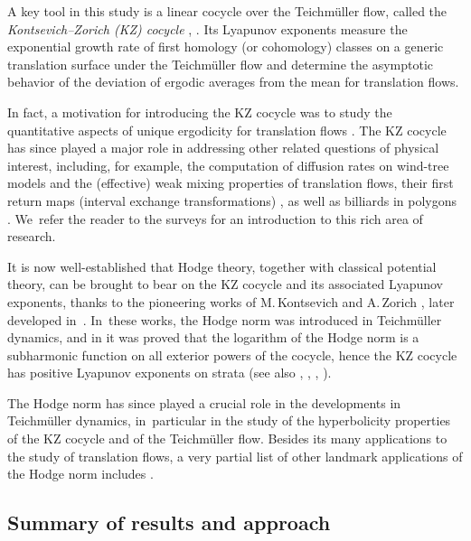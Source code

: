 \documentclass[10pt]{amsart}
\theoremstyle{plain}
\theoremstyle{definition}
\numberwithin{equation}{subsection}
\begin{document}
A key tool in this study is a linear cocycle over the Teichmüller flow, called the \emph{Kontsevich–Zorich (KZ) cocycle} \cite{KZ97}, \cite{Kon97}. Its Lyapunov exponents measure the exponential growth rate of first homology (or cohomology) classes on a generic translation surface under the Teichmüller flow and determine the asymptotic behavior of the deviation of ergodic averages from the mean for translation flows.

In fact, a motivation for introducing the KZ cocycle was to study the quantitative aspects of unique ergodicity for translation flows \cite{Z96,Z97,KZ97, Kon97, For02, AtF08}. The KZ cocycle has since played a major role in addressing other related questions of physical interest, including, for example, the computation of diffusion rates on wind-tree models \cite{DHL14} and the (effective) weak mixing properties of translation flows, their first return maps (interval exchange transformations) \cite{AF04, BS21, For22, AFS23}, as well as billiards in polygons \cite{CF20, AHCF24}. We~refer the reader to the surveys \cite{Z06, FM13, W15, For24} for an introduction to this rich area of research.

It is now well-established that Hodge theory, together with classical potential theory, can be brought to bear on the KZ cocycle and its associated Lyapunov exponents, thanks to the pioneering works of M.\,Kontsevich and A.\,Zorich \cite{KZ97, Kon97}, later developed in~\cite{For02}. In~these works, the Hodge norm was introduced
in Teichmüller dynamics, and in \cite{For02} it was proved that the logarithm of the Hodge norm is a subharmonic function on all exterior powers of the cocycle, hence the KZ cocycle has positive Lyapunov exponents on strata (see also \cite{For06}, \cite{For11}, \cite{FMZ11}, \cite{FMZ12}).

The Hodge norm has since played a crucial role in the developments in Teichmüller dynamics, in~particular in the study of the hyperbolicity properties of the KZ cocycle and of the Teichmüller flow. Besides its many applications to the study of translation flows, a very partial list of other landmark applications of the Hodge norm includes \cite{ABEM12, EKZ14, EMM15,EM18, Fil16a, Fil16b, Fil17}.\enlargethispage{\baselineskip}%

\subsection{Summary of results and approach}
\end{document}
